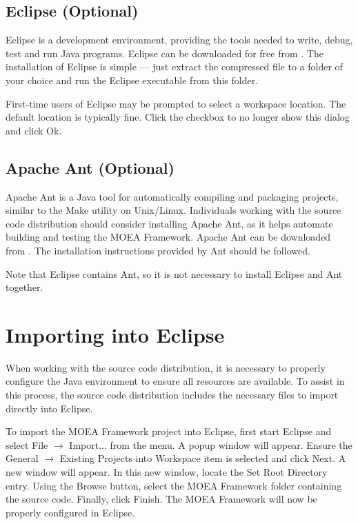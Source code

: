 \subsection{Eclipse (Optional)}
Eclipse is a development environment, providing the tools needed to write, debug, test and run Java programs.  Eclipse can be downloaded for free from .  The installation of Eclipse is simple --- just extract the compressed file to a folder of your choice and run the Eclipse executable from this folder.

First-time users of Eclipse may be prompted to select a workspace location.  The default location is typically fine.  Click the checkbox to no longer show this dialog and click Ok.

\subsection{Apache Ant (Optional)}
Apache Ant is a Java tool for automatically compiling and packaging projects, similar to the Make utility on Unix/Linux.  Individuals working with the source code distribution should consider installing Apache Ant, as it helps automate building and testing the MOEA Framework.  Apache Ant can be downloaded from .  The installation instructions provided by Ant should be followed.

Note that Eclipse contains Ant, so it is not necessary to install Eclipse and Ant together.

\section{Importing into Eclipse}
When working with the source code distribution, it is necessary to properly configure the Java environment to ensure all resources are available.  To assist in this process, the source code distribution includes the necessary files to import directly into Eclipse.

To import the MOEA Framework project into Eclipse, first start Eclipse and select File $\rightarrow$ Import... from the menu.  A popup window will appear.  Ensure the General $\rightarrow$ Existing Projects into Workspace item is selected and click Next.  A new window will appear.  In this new window, locate the Set Root Directory entry.  Using the Browse button, select the MOEA Framework folder containing the source code.  Finally, click Finish.  The MOEA Framework will now be properly configured in Eclipse.


